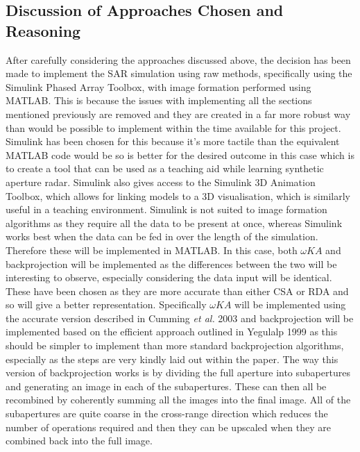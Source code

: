 \subsection{Discussion of Approaches Chosen and Reasoning}
\label{subsec:approach_chosen}
After carefully considering the approaches discussed above, the decision has been made to implement the SAR simulation using raw methods, specifically using the Simulink Phased Array Toolbox, with image formation performed using MATLAB. This is because the issues with implementing all the sections mentioned previously are removed and they are created in a far more robust way than would be possible to implement within the time available for this project. Simulink has been chosen for this because it's more tactile than the equivalent MATLAB code would be so is better for the desired outcome in this case which is to create a tool that can be used as a teaching aid while learning synthetic aperture radar. Simulink also gives access to the Simulink 3D Animation Toolbox, which allows for linking models to a 3D visualisation, which is similarly useful in a teaching environment. Simulink is not suited to image formation algorithms as they require all the data to be present at once, whereas Simulink works best when the data can be fed in over the length of the simulation. Therefore these will be implemented in MATLAB. In this case, both $\omega KA$ and backprojection will be implemented as the differences between the two will be interesting to observe, especially considering the data input will be identical. These have been chosen as they are more accurate than either CSA or RDA and so will give a better representation. Specifically $\omega KA$ will be implemented using the accurate version described in Cumming \textit{et al.} 2003 \cite{cummingInterpretationsOmegaKAlgorithm2003} and backprojection will be implemented based on the efficient approach outlined in Yegulalp 1999 \cite{yegulalpFastBackprojectionAlgorithm1999} as this should be simpler to implement than more standard backprojection algorithms, especially as the steps are very kindly laid out within the paper. The way this version of backprojection works is by dividing the full aperture into subapertures and generating an image in each of the subapertures. These can then all be recombined by coherently summing all the images into the final image. All of the subapertures are quite coarse in the cross-range direction which reduces the number of operations required and then they can be upscaled when they are combined back into the full image. 
